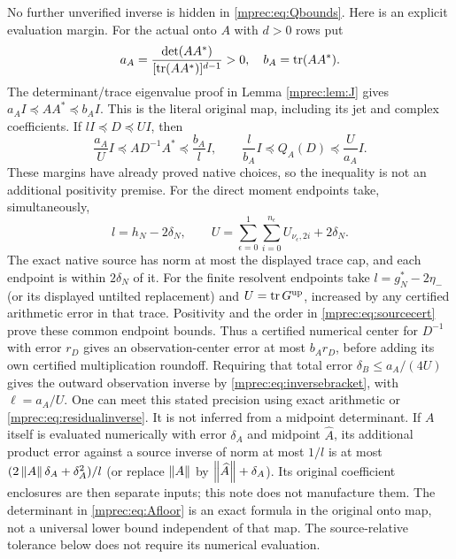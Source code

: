 No further unverified inverse is hidden in \eqref{mprec:eq:Qbounds}.
Here is an explicit evaluation margin. For the actual onto $A$
with $d>0$ rows put
\begin{equation}\label{mprec:eq:Afloor}
 a_A=\frac{\det(AA^*)}{[\operatorname{tr}(AA^*)]^{d-1}}>0,
 \quad b_A=\operatorname{tr}(AA^*).
\end{equation}
The determinant/trace eigenvalue proof in Lemma \ref{mprec:lem:J}
gives $a_AI\preceq AA^*\preceq b_AI$. This is the literal
original map, including its jet and complex coefficients. If
$lI\preceq D\preceq UI$, then
\begin{equation}\label{mprec:eq:obsmargins}
 \frac{a_A}{U}I\preceq AD^{-1}A^*\preceq\frac{b_A}{l}I,
\qquad \frac l{b_A}I\preceq Q_A(D)\preceq\frac U{a_A}I.
\end{equation}
These margins have already proved native choices, so the
inequality is not an additional positivity premise. For the direct
moment endpoints take, simultaneously,
\[
 l=h_N-2\delta_N,\qquad
 U=\sum_{\epsilon=0}^1\sum_{i=0}^{n_\epsilon}
                 U_{\nu_\epsilon,2i}+2\delta_N.
\]
The exact native source has norm at most the displayed trace cap,
and each endpoint is within $2\delta_N$ of it. For the finite
resolvent endpoints take $l=g_N^*-2\eta_-$ (or its displayed
untilted replacement) and $U=\operatorname{tr} G^{\rm up}$, increased by any
certified arithmetic error in that trace. Positivity and the order
in \eqref{mprec:eq:sourcecert} prove these common endpoint bounds.
Thus a certified numerical center for $D^{-1}$ with error $r_D$
gives an observation-center error at most $b_Ar_D$, before adding
its own certified multiplication roundoff. Requiring that total
error $\delta_B\le a_A/(4U)$ gives the outward observation
inverse by \eqref{mprec:eq:inversebracket}, with $\ell=a_A/U$.
One can meet this stated precision using exact arithmetic or
\eqref{mprec:eq:residualinverse}. It is not inferred from a midpoint
determinant. If $A$ itself is evaluated numerically with error
$\delta_A$ and midpoint $\widehat A$, its additional product
error against a source inverse of norm at most $1/l$ is at most
$(2\left\lVert A\right\rVert\delta_A+\delta_A^2)/l$ (or replace $\left\lVert A\right\rVert$
by $\left\lVert\widehat A\right\rVert+\delta_A$). Its original coefficient
enclosures are then separate inputs; this note does not manufacture
them. The determinant in \eqref{mprec:eq:Afloor} is an exact formula
in the original onto map, not a universal lower bound independent
of that map. The source-relative tolerance below does not require
its numerical evaluation.

